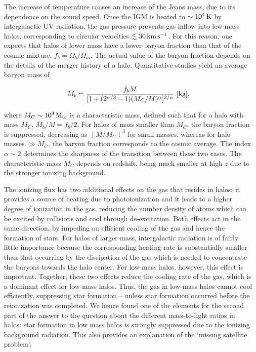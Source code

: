 \documentclass[a4paper,11pt]{article}
\begin{document}
{\noindent}The increase of temperature causes an increase of the Jeans mass, due to its dependence on the sound speed. Once the IGM is heated to $\sim10^4\,{\rm K}$ by intergalactic UV radiation, the gas pressure prevents gas inflow into low-mass halos, corresponding to circular velocities $\lesssim30\,{\rm km\,s^{-1}}$. For this reason, one expects that halos of lower mass have a lower baryon fraction than that of the cosmic mixture, $f_b=\Omega_b/\Omega_m$. The actual value of the baryon fraction depends on the details of the merger history of a halo. Quantitative studies yield an average baryon mass of

\begin{align*}
    \bar{M}_b = \frac{f_b M}{[1+(2^{\alpha/3}-1)(M_C/M)^\alpha]^{3/\alpha}} ~ [{\rm kg}],
\end{align*}

{\noindent}where $M_C\sim10^9\,{\rm M_\odot}$ is a characteristic mass, defined such that for a halo with mass $M_C$, $\bar{M}_b/M=f_b/2$. For halos of mass smaller than $M_C$, the baryon fraction is suppressed, decreasing as $(M/M_C)^3$ for small masses, whereas for halo masses $\gg M_C$, the baryon fraction corresponds to the cosmic average. The index $\alpha\sim2$ determines the sharpness of the transition between these two cases. The characteristic mass $M_C$ depends on redshift, being much smaller at high $z$ due to the stronger ionizing background.

{\noindent}The ionizing flux has two additional effects on the gas that resides in halos: it provides a source of heating due to photoionization and it leads to a higher degree of ionization in the gas, reducing the number density of atoms which can be excited by collisions and cool through de-excitation. Both effects act in the same direction, by impeding an efficient cooling of the gas and hence the formation of stars. For halos of larger mass, intergalactic radiation is of fairly little importance because the corresponding heating rate is substantially smaller than that occurring by the dissipation of the gas which is needed to concentrate the baryons towards the halo center. For low-mass halos, however, this effect is important. Together, these two effects reduce the cooling rate of the gas, which is a dominant effect for low-mass halos. Thus, the gas in low-mass halos cannot cool efficiently, suppressing star formation -- unless star formation occurred before the reionization was completed. We hence found one of the elements for the second part of the answer to the question about the different mass-to-light ratios in halos: star formation in low mass halos is strongly suppressed due to the ionizing background radiation. This also provides an explanation of the `missing satellite problem'.
\end{document}
